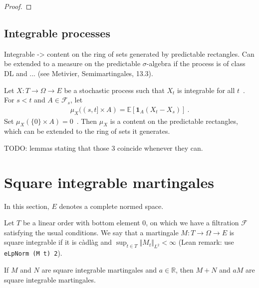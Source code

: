 \begin{proof}

\end{proof}




\subsection{Integrable processes}

Integrable -> content on the ring of sets generated by predictable rectangles.
Can be extended to a measure on the predictable $\sigma$-algebra if the process is of class DL and ... (see Metivier, Semimartingales, 13.3).

Let $X : T \to \Omega \to E$ be a stochastic process such that $X_t$ is integrable for all $t$~.
For $s < t$ and $A \in \mathcal{F}_s$, let
\begin{align*}
  \mu_X((s, t] \times A) = \mathbb{E}[\mathbf{1}_A (X_t - X_s)]
  \: .
\end{align*}
Set $\mu_X(\{0\} \times A) = 0$~.
Then $\mu_X$ is a content on the predictable rectangles, which can be extended to the ring of sets it generates.

TODO: lemmas stating that those 3 coincide whenever they can.



\section{Square integrable martingales}

In this section, $E$ denotes a complete normed space.

\begin{definition}\label{def:IsSquareIntegrable}
  \leanok
Let $T$ be a linear order with bottom element 0, on which we have a filtration $\mathcal{F}$ satisfying the usual conditions.
We say that a martingale $M : T \to \Omega \to E$ is square integrable if it is càdlàg and $\sup_{t \in T} \Vert M_t \Vert_{L^2} < \infty$ (Lean remark: use \texttt{eLpNorm (M t) 2}).
\end{definition}


\begin{lemma}\label{lem:IsSquareIntegrable.module}
  \leanok
If $M$ and $N$ are square integrable martingales and $a \in \mathbb{R}$, then $M + N$ and $a M$ are square integrable martingales.
\end{lemma}

